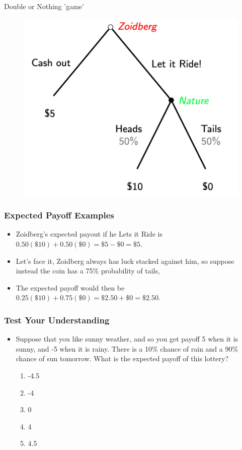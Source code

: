 
\begin{frame}{Double or Nothing 'game'}
  \begin{figure}
    \includegraphics[width = .8\textwidth]{figures/doubleornothing.png}
  \end{figure}
\end{frame}


\begin{frame}
\frametitle{Expected Payoff Examples}
\begin{itemize}

  \item Zoidberg's expected payout if he Lets it Ride is 
	$0.50(\$10) + 0.50(\$0) = \$5 - \$0 = \$5$.

  \bigskip
	\item Let's face it, Zoidberg always has luck stacked against him, so suppose instead the coin has a 75\% probability of tails,
  \item The expected payoff would then be $0.25(\$10) + 0.75(\$0) = \$2.50 + \$0 = \$2.50 $.
\end{itemize}
\end{frame}


\begin{frame}
\frametitle{Test Your Understanding}
\begin{itemize}
	\item Suppose that you like sunny weather, and so you get payoff 5 when it is sunny, and -5 when it is rainy. There is a 10\% chance of rain and a 90\% chance of sun tomorrow. What is the expected payoff of this lottery?
	\begin{enumerate}
		\item -4.5
		\item -4
		\item 0
		\item 4
		\item 4.5
	\end{enumerate}
\end{itemize}
\end{frame}

